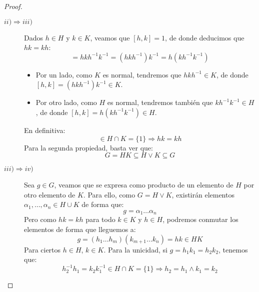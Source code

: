 \begin{teo}
\begin{proof}
\begin{description}
            \item [$ii)\Longrightarrow iii)$] Dados $h\in H$ y $k\in K$, veamos que $[h,k] = 1$, de donde deducimos que $hk = kh$:
                \begin{equation*}
                    [h,k] = hkh^{-1}k^{-1} = (hkh^{-1})k^{-1} = h(kh^{-1}k^{-1})
                \end{equation*}
                \begin{itemize}
                    \item Por un lado, como $K$ es normal, tendremos que $hkh^{-1}\in K$, de donde $[h,k] = (hkh^{-1})k^{-1}\in K$. 
                    \item Por otro lado, como $H$ es normal, tendremos también que $kh^{-1}k^{-1} \in H$, de donde $[h,k] = h(kh^{-1}k^{-1}) \in H$.
                \end{itemize}
                En definitiva:
                \begin{equation*}
                    [h,k] \in H\cap K = \{1\} \Longrightarrow hk = kh
                \end{equation*}
                Para la segunda propiedad, basta ver que:
                \begin{equation*}
                    G = HK \subseteq H\lor K \subseteq G
                \end{equation*}
            \item [$iii)\Longrightarrow iv)$] Sea $g\in G$, veamos que se expresa como producto de un elemento de $H$ por otro elemento de $K$. Para ello, como $G = H\lor K$, existirán elementos $\alpha_1,\ldots,\alpha_n \in H\cup K$ de forma que:
                \begin{equation*}
                    g = \alpha_1 \ldots \alpha_n
                \end{equation*}
                Pero como $hk = kh$ para todo $k\in K$ y $h\in H$, podremos conmutar los elementos de forma que lleguemos a:
                \begin{equation*}
                    g = (h_1 \ldots h_m) (k_{m+1} \ldots k_{n}) = hk \in HK
                \end{equation*}
                Para ciertos $h\in H$, $k\in K$.
                Para la unicidad, si $g = h_1k_1 = h_2 k_2$, tenemos que:
                \begin{equation*}
                    h_2^{-1}h_1 = k_2k_1^{-1} \in H\cap K = \{1\} \Longrightarrow h_2 = h_1 \land k_1 = k_2
                \end{equation*}

\end{description}
\end{proof}
\end{teo}
